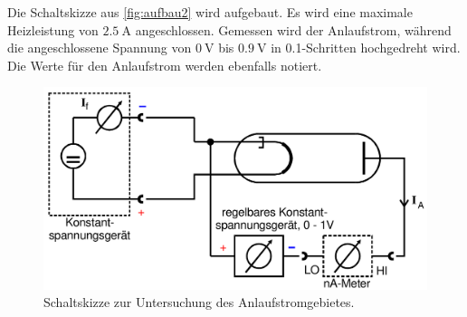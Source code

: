 Die Schaltskizze aus \autoref{fig:aufbau2} wird aufgebaut.
Es wird eine maximale Heizleistung von $\SI{2.5}{\ampere}$ angeschlossen.
Gemessen wird der Anlaufstrom, während die angeschlossene Spannung von $\SI{0}{\volt}$ bis $\SI{0.9}{\volt}$ in
\num{0.1}-Schritten hochgedreht wird. Die Werte für den Anlaufstrom werden ebenfalls notiert.

\begin{figure}[H]
    \centering
    \includegraphics[width=0.5\linewidth]{content/grafik/aufbau2.png}
    \caption{Schaltskizze zur Untersuchung des Anlaufstromgebietes.\cite{elektron}}
    \label{fig:aufbau2}
\end{figure}
